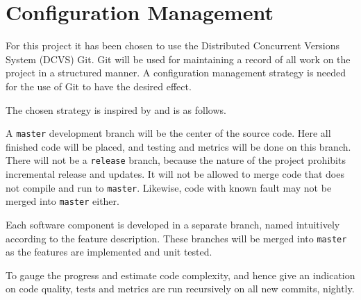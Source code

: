 \documentclass[Main_Assignment3]{subfiles}
\begin{document}
	\section{Configuration Management} %
		\label{sec:configuration_management}
		For this project it has been chosen to use the Distributed Concurrent Versions System (DCVS) Git.
		Git will be used for maintaining a record of all work on the project in a structured manner.
		A configuration management strategy is needed for the use of Git to have the desired effect.

		The chosen strategy is inspired by \cite{vincentdriessen2010} and is as follows.

		A \texttt{master} development branch will be the center of the source code. Here all finished code will be placed, and testing and metrics will be done on this branch.
		There will not be a \texttt{release} branch, because the nature of the project prohibits incremental release and updates.
		It will not be allowed to merge code that does not compile and run to \texttt{master}.
		Likewise, code with known fault may not be merged into \texttt{master} either.

		Each software component is developed in a separate branch, named intuitively according to the feature description.
		These branches will be merged into \texttt{master} as the features are implemented and unit tested.

		To gauge the progress and estimate code complexity, and hence give an indication on code quality, tests and metrics are run recursively on all new commits, nightly.

\end{document}
